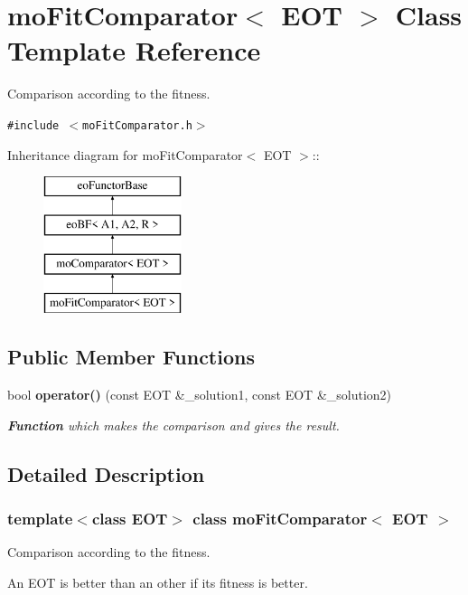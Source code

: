 \section{moFitComparator$<$ EOT $>$ Class Template Reference}
\label{classmo_fit_comparator}
Comparison according to the fitness.  


{\tt \#include $<$moFitComparator.h$>$}

Inheritance diagram for moFitComparator$<$ EOT $>$::\begin{figure}[H]
\begin{center}
\leavevmode
\includegraphics[height=4cm]{classmo_fit_comparator}
\end{center}
\end{figure}
\subsection*{Public Member Functions}
\begin{CompactItemize}
\item 
bool {\bf operator()} (const EOT \&\_\-solution1, const EOT \&\_\-solution2)
\begin{CompactList}\small\item\em {\bf Function} which makes the comparison and gives the result. \item\end{CompactList}\end{CompactItemize}


\subsection{Detailed Description}
\subsubsection*{template$<$class EOT$>$ class moFitComparator$<$ EOT $>$}

Comparison according to the fitness. 

An EOT is better than an other if its fitness is better. 

